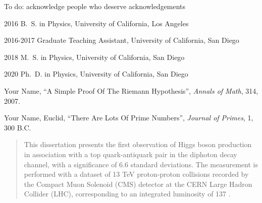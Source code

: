 \begin{frontmatter}
%
%
\begin{acknowledgements}
 To do: acknowledge people who deserve acknowledgements
\end{acknowledgements}


%
%
\begin{vitapage}
\begin{vita}
  \item[2016] B.~S. in Physics, University of California, Los Angeles
  \item[2016-2017] Graduate Teaching Assistant, University of California, San Diego
  \item[2018] M.~S. in Physics, University of California, San Diego
  \item[2020] Ph.~D. in Physics, University of California, San Diego
\end{vita}
\begin{publications}
  \item Your Name, ``A Simple Proof Of The Riemann Hypothesis'', \emph{Annals of Math}, 314, 2007.
  \item Your Name, Euclid, ``There Are Lots Of Prime Numbers'', \emph{Journal of Primes}, 1, 300 B.C.
\end{publications}
\end{vitapage}


%
%
\begin{abstract}
  This dissertation presents the first observation of Higgs boson production in association with a top quark-antiquark pair in the diphoton decay channel, with a significance of 6.6 standard deviations.
  The measurement is performed with a dataset of 13 TeV proton-proton collisions recorded by the Compact Muon Solenoid (CMS) detector at the CERN Large Hadron Collider (LHC), corresponding to an integrated luminosity of 137 \fb.

\end{abstract}


\end{frontmatter}
